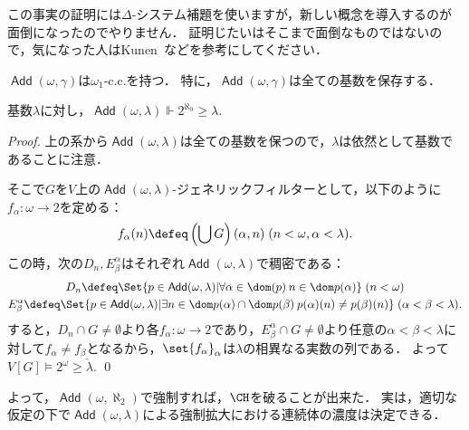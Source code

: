 \documentclass[a4j]{ltjsarticle}
\DeclareMathOperator{\Add}{\mathsf{Add}}
\begin{document}
この事実の証明には$\Delta$-システム補題を使いますが，新しい概念を導入するのが面倒になったのでやりません．
証明じたいはそこまで面倒なものではないので，気になった人はKunen~\cite{Kunen:2011}などを参考にしてください．

\begin{corollary}
 $\Add(\omega, \gamma)$は$\omega_1$-c.c.を持つ．
 特に，$\Add(\omega, \gamma)$は全ての基数を保存する．
\end{corollary}

\begin{lemma}
 基数$\lambda$に対し，$\Add(\omega, \lambda) \Vdash 2^{\aleph_0} \geq \lambda$.
\end{lemma}
\begin{proof}
 上の系から$\Add(\omega, \lambda)$は全ての基数を保つので，$\lambda$は依然として基数であることに注意．

 そこで$G$を$V$上の$\Add(\omega, \lambda)$-ジェネリックフィルターとして，以下のように$f_\alpha : \omega \to 2$を定める：
 \[
  f_\alpha(n) \defeq \left(\bigcup G\right)(\alpha, n)\;(n < \omega, \alpha < \lambda).
 \]
 この時，次の$D_n, E^\alpha_\beta$はそれぞれ$\Add(\omega, \lambda)$で稠密である：
 \begin{gather*}
   D_n \defeq \Set{p \in \Add(\omega, \lambda) | \forall \alpha \in \dom(p) \: n \in \dom p(\alpha)}\; (n < \omega)\\
  E^\alpha_\beta \defeq \Set{p \in \Add(\omega, \lambda) | \exists n \in \dom p(\alpha) \cap \dom p(\beta) \: p(\alpha)(n) \neq p(\beta)(n)} \; (\alpha < \beta < \lambda).
 \end{gather*}
 すると，$D_n \cap G \neq \emptyset$より各$f_\alpha : \omega \to 2$であり，$E^\alpha_\beta \cap G \neq \emptyset$より任意の$\alpha < \beta < \lambda$に対して$f_\alpha \neq f_\beta$となるから，$\set{f_\alpha}_\alpha$は$\lambda$の相異なる実数の列である．
 よって$V[G] \models 2^\omega \geq \check{\lambda}$. \qed
\end{proof}

よって，$\Add(\omega, \aleph_2)$で強制すれば，$\CH$を破ることが出来た．
実は，適切な仮定の下で$\Add(\omega, \lambda)$による強制拡大における連続体の濃度は決定できる．
\end{document}
